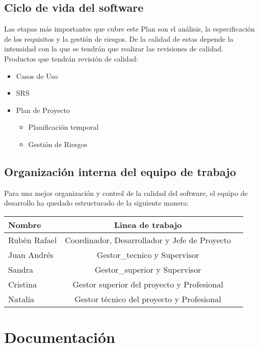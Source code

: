 \documentclass[11pt, a4paper, twoside, titlepage]{article}
\begin{document}
		\subsection{Ciclo de vida del software} %
			Las etapas más importantes que cubre este Plan son el análisis, la especificación de los requisitos y la gestión de riesgos. De la calidad de estas depende la intensidad con la que se tendrán que realizar las revisiones de calidad. \\
			Productos que tendrán revisión de calidad: \\
				\begin{itemize}
					\item Casos de Uso
					\item SRS
					\item Plan de Proyecto
						\begin{itemize}
							\item Planificación temporal
							\item Gestión de Riesgos
						\end{itemize}
				\end{itemize}
				
		\subsection{Organización interna del equipo de trabajo}
		
			Para una mejor organización y control de la calidad del software, el equipo de desarrollo ha quedado estructurado de la siguiente manera: \\
	
			\begin{tabular}[t]{|l |c |r|}
			\hline
			\textbf{Nombre} & \textbf{Linea de trabajo}\\
			\hline
			Rubén Rafael & Coordinador, Desarrollador y Jefe de Proyecto\\
			\hline
			Juan Andrés & \gls{Gestor_tecnico} y Supervisor\\
			\hline
			Sandra & \gls{Gestor_superior} y Supervisor\\
			\hline
			Cristina & Gestor superior del proyecto y \gls{Profesional}\\
			\hline
			Natalia & Gestor técnico del proyecto y Profesional\\
			\hline
			\end{tabular}
			
	\section{Documentación}
\end{document}
